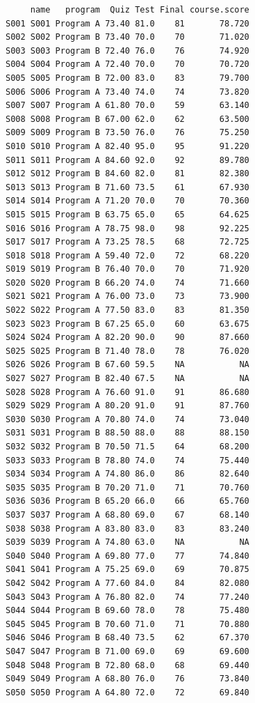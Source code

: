 \documentclass[
  letterpaper,
  DIV=11,
  numbers=noendperiod]{scrreprt}
\begin{document}
\begin{verbatim}
     name   program  Quiz Test Final course.score
S001 S001 Program A 73.40 81.0    81       78.720
S002 S002 Program B 73.40 70.0    70       71.020
S003 S003 Program B 72.40 76.0    76       74.920
S004 S004 Program A 72.40 70.0    70       70.720
S005 S005 Program B 72.00 83.0    83       79.700
S006 S006 Program A 73.40 74.0    74       73.820
S007 S007 Program A 61.80 70.0    59       63.140
S008 S008 Program B 67.00 62.0    62       63.500
S009 S009 Program B 73.50 76.0    76       75.250
S010 S010 Program A 82.40 95.0    95       91.220
S011 S011 Program A 84.60 92.0    92       89.780
S012 S012 Program B 84.60 82.0    81       82.380
S013 S013 Program B 71.60 73.5    61       67.930
S014 S014 Program A 71.20 70.0    70       70.360
S015 S015 Program B 63.75 65.0    65       64.625
S016 S016 Program A 78.75 98.0    98       92.225
S017 S017 Program A 73.25 78.5    68       72.725
S018 S018 Program A 59.40 72.0    72       68.220
S019 S019 Program B 76.40 70.0    70       71.920
S020 S020 Program B 66.20 74.0    74       71.660
S021 S021 Program A 76.00 73.0    73       73.900
S022 S022 Program A 77.50 83.0    83       81.350
S023 S023 Program B 67.25 65.0    60       63.675
S024 S024 Program A 82.20 90.0    90       87.660
S025 S025 Program B 71.40 78.0    78       76.020
S026 S026 Program B 67.60 59.5    NA           NA
S027 S027 Program B 82.40 67.5    NA           NA
S028 S028 Program A 76.60 91.0    91       86.680
S029 S029 Program A 80.20 91.0    91       87.760
S030 S030 Program A 70.80 74.0    74       73.040
S031 S031 Program B 88.50 88.0    88       88.150
S032 S032 Program B 70.50 71.5    64       68.200
S033 S033 Program B 78.80 74.0    74       75.440
S034 S034 Program A 74.80 86.0    86       82.640
S035 S035 Program B 70.20 71.0    71       70.760
S036 S036 Program B 65.20 66.0    66       65.760
S037 S037 Program A 68.80 69.0    67       68.140
S038 S038 Program A 83.80 83.0    83       83.240
S039 S039 Program A 74.80 63.0    NA           NA
S040 S040 Program A 69.80 77.0    77       74.840
S041 S041 Program A 75.25 69.0    69       70.875
S042 S042 Program A 77.60 84.0    84       82.080
S043 S043 Program A 76.80 82.0    74       77.240
S044 S044 Program B 69.60 78.0    78       75.480
S045 S045 Program B 70.60 71.0    71       70.880
S046 S046 Program B 68.40 73.5    62       67.370
S047 S047 Program B 71.00 69.0    69       69.600
S048 S048 Program B 72.80 68.0    68       69.440
S049 S049 Program A 68.80 76.0    76       73.840
S050 S050 Program A 64.80 72.0    72       69.840

\end{verbatim}
\end{document}
